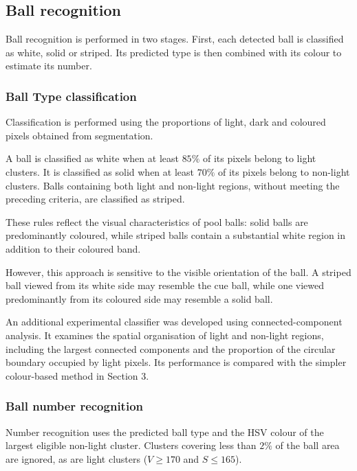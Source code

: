 \documentclass[10pt,a4paper]{article}
\begin{document}
\subsection{Ball recognition}

Ball recognition is performed in two stages. First, each detected ball
is classified as white, solid or striped. Its predicted type is then
combined with its colour to estimate its number.

\subsubsection{Ball Type classification}

Classification is performed using the proportions of light, dark and coloured 
pixels obtained from segmentation.

A ball is classified as white when at least $85\%$ of its pixels belong to 
light clusters. It is classified as solid when at least $70\%$ of its pixels 
belong to non-light clusters. Balls containing both light and non-light 
regions, without meeting the preceding criteria, are classified as striped.

These rules reflect the visual characteristics of pool balls: solid balls are 
predominantly coloured, while striped balls contain a substantial white region
in addition to their coloured band.

However, this approach is sensitive to the visible orientation of the ball. 
A striped ball viewed from its white side may resemble the cue ball, while one
viewed predominantly from its coloured side may resemble a solid ball.

An additional experimental classifier was developed using connected-component 
analysis. It examines the spatial organisation of light and non-light regions, 
including the largest connected components and the proportion of the circular 
boundary occupied by light pixels. Its performance is compared with the simpler 
colour-based method in Section 3.

\subsubsection{Ball number recognition}

Number recognition uses the predicted ball type and the HSV colour
of the largest eligible non-light cluster. Clusters covering less
than $2\%$ of the ball area are ignored, as are light clusters
($V \geq 170$ and $S \leq 165$).
\end{document}
